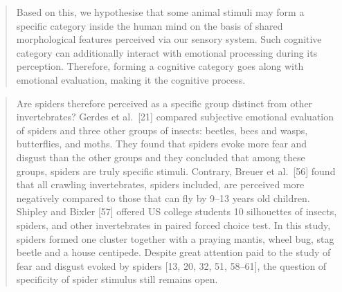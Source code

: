 \documentclass[
]{book}
\begin{document}
\begin{quote}
Based on this, we hypothesise that some animal stimuli may form a specific category inside the human mind on the basis of shared morphological features perceived via our sensory system. Such cognitive category can additionally interact with emotional processing during its perception. Therefore, forming a cognitive category goes along with emotional evaluation, making it the cognitive process.
\end{quote}

\begin{quote}
Are spiders therefore perceived as a specific group distinct from other invertebrates? Gerdes et al.~{[}21{]} compared subjective emotional evaluation of spiders and three other groups of insects: beetles, bees and wasps, butterflies, and moths. They found that spiders evoke more fear and disgust than the other groups and they concluded that among these groups, spiders are truly specific stimuli. Contrary, Breuer et al.~{[}56{]} found that all crawling invertebrates, spiders included, are perceived more negatively compared to those that can fly by 9--13 years old children. Shipley and Bixler {[}57{]} offered US college students 10 silhouettes of insects, spiders, and other invertebrates in paired forced choice test. In this study, spiders formed one cluster together with a praying mantis, wheel bug, stag beetle and a house centipede. Despite great attention paid to the study of fear and disgust evoked by spiders {[}13, 20, 32, 51, 58--61{]}, the question of specificity of spider stimulus still remains open.
\end{quote}
\end{document}
